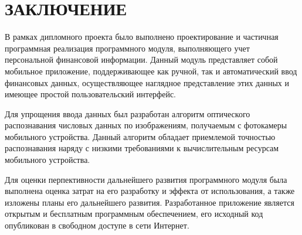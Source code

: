 \section*{ЗАКЛЮЧЕНИЕ}

В рамках дипломного проекта было выполнено проектирование и
частичная программная реализация программного модуля,
выполняющего учет персональной финансовой информации.
Данный модуль представляет собой мобильное приложение,
поддерживающее как ручной, так и автоматический ввод
финансовых данных, осуществляющее наглядное представление этих данных
и имеющее простой пользовательский интерфейс.

Для упрощения ввода данных был разработан
алгоритм оптического распознавания числовых данных по изображениям,
получаемым с фотокамеры мобильного устройства.
Данный алгоритм обладает приемлемой точностью распознавания
наряду с низкими требованиями к
вычислительным ресурсам мобильного устройства.

Для оценки перпективности дальнейшего развития программного модуля
была выполнена оценка затрат на его разработку и эффекта от использования,
а также изложены планы его дальнейшего развития.
Разработанное приложение является открытым и бесплатным программным обеспечением,
его исходный код опубликован в свободном доступе в сети Интернет.